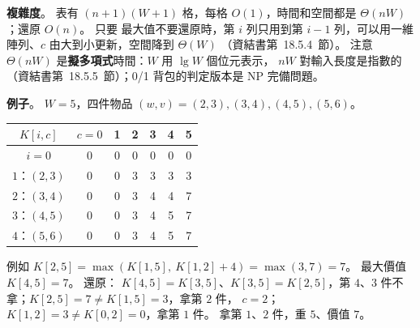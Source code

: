 \begin{pastsoln}
\textbf{複雜度}。 表有 $(n + 1)(W + 1)$ 格，每格 $O(1)$，時間和空間都是 $\Theta(nW)$；還原 $O(n)$。 只要
最大值不要還原時，第 $i$ 列只用到第 $i - 1$ 列，可以用一維陣列、$c$ 由大到小更新，空間降到 $\Theta(W)$
（資結書第~18.5.4~節）。 注意 $\Theta(nW)$ 是\textbf{擬多項式}時間：$W$ 用 $\lg W$ 個位元表示，
$nW$ 對輸入長度是指數的（資結書第~18.5.5~節）；0/1 背包的判定版本是 NP 完備問題。

\textbf{例子}。 $W = 5$，四件物品 $(w, v) = (2, 3), (3, 4), (4, 5), (5, 6)$。
\begin{center}
\small
\begin{tabular}{c|cccccc}
$K[i, c]$ & $c = 0$ & 1 & 2 & 3 & 4 & 5 \\ \hline
$i = 0$ & 0 & 0 & 0 & 0 & 0 & 0 \\
$1$：$(2, 3)$ & 0 & 0 & 3 & 3 & 3 & 3 \\
$2$：$(3, 4)$ & 0 & 0 & 3 & 4 & 4 & 7 \\
$3$：$(4, 5)$ & 0 & 0 & 3 & 4 & 5 & 7 \\
$4$：$(5, 6)$ & 0 & 0 & 3 & 4 & 5 & 7 \\
\end{tabular}
\end{center}
例如 $K[2, 5] = \max(K[1, 5],\ K[1, 2] + 4) = \max(3, 7) = 7$。 最大價值 $K[4, 5] = 7$。 還原：
$K[4,5] = K[3,5]$、$K[3,5] = K[2,5]$，第 $4$、$3$ 件不拿；$K[2,5] = 7 \ne K[1,5] = 3$，拿第 $2$ 件，
$c = 2$；$K[1,2] = 3 \ne K[0,2] = 0$，拿第 $1$ 件。 拿第 $1$、$2$ 件，重 $5$、價值 $7$。
\end{pastsoln}
